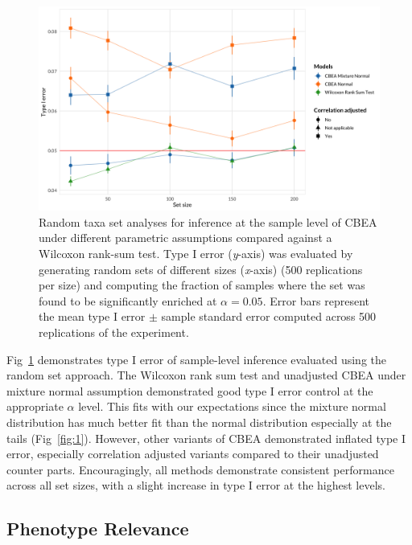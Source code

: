 \documentclass[10pt,letterpaper]{article}
\begin{document}
\begin{figure}[!h]
    \centering
    \includegraphics[width = \textwidth]{figures/data_ss_fdr_new.png}
    \caption{Random taxa set analyses for inference at the sample level of CBEA under different parametric assumptions compared against a Wilcoxon rank-sum test. Type I error (\emph{y}-axis) was evaluated by generating random sets of different sizes (\emph{x}-axis) (500 replications per size) and computing the fraction of samples where the set was found to be significantly enriched at $\alpha = 0.05$. Error bars represent the mean type I error $\pm$ sample standard error computed across 500 replications of the experiment.} 
    \label{fig:2}
\end{figure}

Fig~\ref{fig:2} demonstrates type I error of sample-level inference evaluated using the random set approach. The Wilcoxon rank sum test and unadjusted CBEA under mixture normal assumption demonstrated good type I error control at the appropriate $\alpha$ level. This fits with our expectations since the mixture normal distribution has much better fit than the normal distribution especially at the tails (Fig~\ref{fig:1}). However, other variants of CBEA demonstrated inflated type I error, especially correlation adjusted variants compared to their unadjusted counter parts. Encouragingly, all methods demonstrate consistent performance across all set sizes, with a slight increase in type I error at the highest levels.   

\subsection*{Phenotype Relevance} 
\end{document}
